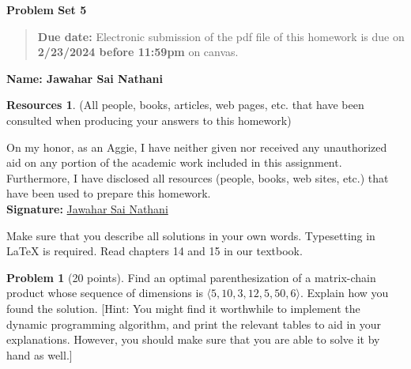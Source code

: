 \documentclass{article}
\theoremstyle{definition}
\newtheorem{problem}{Problem}
\newtheorem*{resources}{Resources}
\newcommand{\name}[1]{\noindent\textbf{Name: #1}}
\newcommand{\honor}{\noindent On my honor, as an Aggie, I have neither
  given nor received any unauthorized aid on any portion of the
  academic work included in this assignment. Furthermore, I have
  disclosed all resources (people, books, web sites, etc.) that have
  been used to prepare this homework. \\[1ex]
 \textbf{Signature:} \underline{Jawahar Sai Nathani}{\hspace*{5cm}} }
\newcommand{\problemset}[1]{\begin{center}\textbf{Problem Set
      #1}\end{center}}
\newcommand{\duedate}[1]{\begin{quote}\textbf{Due date:} Electronic
    submission of the pdf file of this homework is due on
    \textbf{#1} on canvas. \end{quote} }
\begin{document}
\problemset{5}
\duedate{2/23/2024 before 11:59pm}
\name{Jawahar Sai Nathani}
\begin{resources} (All people, books, articles, web pages, etc. that
  have been consulted when producing your answers to this homework)
\end{resources}
\honor

\newpage
Make sure that you describe all solutions in your own
words. Typesetting in \LaTeX{} is required. Read
chapters 14 and 15 in our textbook. 

\begin{problem}[20 points]
  Find an optimal parenthesization of a matrix-chain product whose
  sequence of dimensions is $\langle 5, 10, 3, 12, 5, 50, 6\rangle$. 
  Explain how you found the solution. [Hint: You might find it
  worthwhile to implement the dynamic programming algorithm, and print
  the relevant tables to aid in your explanations. However, you should
  make sure that you are able to solve it by hand as well.] 
\end{problem}
\end{document}
